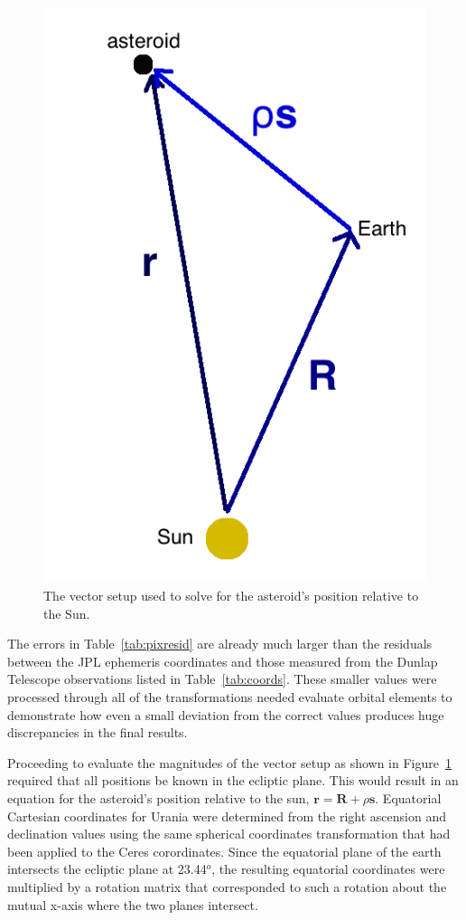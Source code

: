 \documentclass[a4paper,12pt]{article}
\begin{document}
\begin{figure}
\includegraphics[scale = 0.3]{vectors.png}
\caption{The vector setup used to solve for the asteroid's position relative to the Sun.}
\label{fig:vectors}
\end{figure}

The errors in Table~\ref{tab:pixresid} are already much larger than the residuals between the JPL ephemeris coordinates and those measured from the Dunlap Telescope observations listed in Table~\ref{tab:coords}. These smaller values were processed through all of the transformations needed evaluate orbital elements to demonstrate how even a small deviation from the correct values produces huge discrepancies in the final results.

Proceeding to evaluate the magnitudes of the vector setup as shown in Figure~\ref{fig:vectors} required that all positions be known in the ecliptic plane. This would result in an equation for the asteroid's position relative to the sun, $\mathbf{r} = \mathbf{R} + \rho\mathbf{s}$. Equatorial Cartesian coordinates for Urania were determined from the right ascension and declination values using the same spherical coordinates transformation that had been applied to the Ceres corordinates. Since the equatorial plane of the earth intersects the ecliptic plane at 23.44$^o$, the resulting equatorial coordinates were multiplied by a rotation matrix that corresponded to such a rotation about the mutual x-axis where the two planes intersect.
\end{document}
